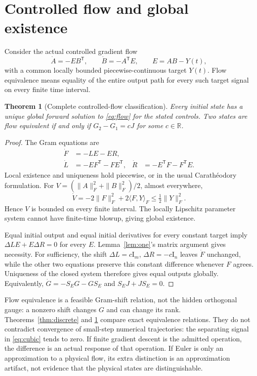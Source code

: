 \documentclass[11pt]{article}
\newtheorem{theorem}{Theorem}[section]
\theoremstyle{remark}\newtheorem{remark}[theorem]{Remark}
\newcommand{\R}{\mathbb R}
\newcommand{\Id}{\mathrm I}
\begin{document}
\section{Controlled flow and global existence}
Consider the actual controlled gradient flow
\begin{equation}\label{eq:flow}
 \dot A=-EB^{\mathsf T},\qquad \dot B=-A^{\mathsf T}E,
 \qquad E=AB-Y(t),
\end{equation}
with a common locally bounded piecewise-continuous target $Y(t)$.
Flow equivalence means equality of the entire output path for every
such target signal on every finite time interval.

\begin{theorem}[Complete controlled-flow classification]\label{thm:flow}
Every initial state has a unique global forward solution to
\eqref{eq:flow} for the stated controls. Two states are flow equivalent
if and only if $G_2-G_1=cJ$ for some $c\in\R$.
\end{theorem}
\begin{proof}
The Gram equations are
\begin{align*}
 \dot F&=-LE-ER,\\
 \dot L&=-EF^{\mathsf T}-FE^{\mathsf T},&
 \dot R&=-E^{\mathsf T}F-F^{\mathsf T}E.
\end{align*}
Local existence and uniqueness hold piecewise, or in the usual
Carath\'eodory formulation. For
$V=(\|A\|_F^2+\|B\|_F^2)/2$, almost everywhere,
\[
 \dot V=-2\|F\|_F^2+2\langle F,Y\rangle_F
          \leq \tfrac12\|Y\|_F^2.
\]
Hence $V$ is bounded on every finite interval. The locally Lipschitz
parameter system cannot have finite-time blowup, giving global existence.

Equal initial output and equal initial derivatives for every constant
target imply $\Delta LE+E\Delta R=0$ for every $E$.
Lemma~\ref{lem:one}'s matrix argument gives necessity.
For sufficiency, the shift $\Delta L=c\Id_m$, $\Delta R=-c\Id_n$
leaves $\dot F$ unchanged, while the other two equations preserve this
constant difference whenever $F$ agrees. Uniqueness of the closed system
therefore gives equal outputs globally. Equivalently,
$\dot G=-S_EG-GS_E$ and $S_EJ+JS_E=0$.
\end{proof}

Flow equivalence is a feasible Gram-shift relation, not the hidden
orthogonal gauge: a nonzero shift changes $G$ and can change its rank.
Theorems~\ref{thm:discrete} and \ref{thm:flow} compare exact equivalence
relations. They do not contradict convergence of small-step numerical
trajectories: the separating signal in \eqref{eq:cubic} tends to zero.
If finite gradient descent is the admitted operation, the difference is
an actual response of that operation. If Euler is only an approximation
to a physical flow, its extra distinction is an approximation artifact,
not evidence that the physical states are distinguishable.
\end{document}

